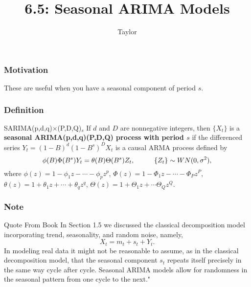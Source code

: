 \documentclass{beamer}
\title["6.5"]{6.5: Seasonal ARIMA Models}
\author{Taylor}
\institute[UVA] 
{
University of Virginia \\
\medskip
\textit{} 
}
\date{}
\begin{document}

\begin{frame}
\titlepage 
\end{frame}


\begin{frame}
\frametitle{Motivation}

These are useful when you have a seasonal component of period $s$.
\newline

\end{frame}


\begin{frame}
\frametitle{Definition}

\begin{block}{SARIMA(p,d,q)$\times$(P,D,Q)$_s$}
If $d$ and $D$ are nonnegative integers, then $\{X_t\}$ is a {\bf seasonal ARIMA(p,d,q)(P,D,Q) process with period $s$} if the differenced series $Y_t = (1-B)^d(1-B^s)^DX_t $ is a causal ARMA process defined by
\[
\phi(B)\Phi(B^s)Y_t = \theta(B) \Theta(B^s)Z_t, \hspace{10mm} \{Z_t\} \sim WN(0,\sigma^2),
\]
where $\phi(z) = 1 - \phi_1 z - \cdots - \phi_p z^p$, $\Phi(z) = 1 - \Phi_1 z - \cdots - \Phi_P z^P$, $\theta(z) = 1 + \theta_1 z + \cdots + \theta_q z^q$, $\Theta(z) = 1 + \Theta_1 z + \cdots \Theta_Q z^Q$.

\end{block}

\end{frame}


\begin{frame}
\frametitle{Note}

\begin{block}{Quote From Book}
In Section 1.5 we discussed the classical decomposition model incorporating trend, seasonality, and random noise, namely, 
\[
X_t = m_t + s_t + Y_t .
\]
In modeling real data it might not be reasonable to assume, as in the classical decomposition model, that the seasonal component $s_t$ repeats itself precisely in the same way cycle after cycle. Seasonal ARIMA models allow for randomness in the seasonal pattern from one cycle to the next."
\end{block}

\end{frame}
\end{document}
